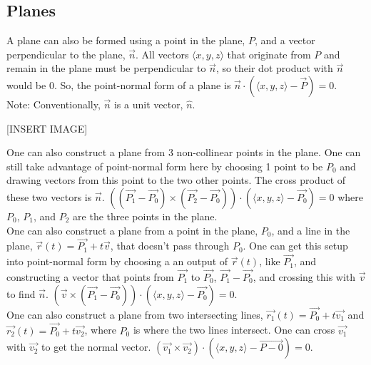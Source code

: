 \subsection{Planes}
\noindent
A plane can also be formed using a point in the plane, $P$, and a vector perpendicular to the plane, $\vec{n}$. All vectors $\langle x,y,z \rangle$ that originate from $P$ and remain in the plane must be perpendicular to $\vec{n}$, so their dot product with $\vec{n}$ would be 0. So, the point-normal form of a plane is $\vec{n}\cdot\left(\langle x,y,z \rangle - \vec{P}\right)=0$.\\
\small{Note: Conventionally, $\vec{n}$ is a unit vector, $\hat{n}$.}

[INSERT IMAGE]

\noindent
One can also construct a plane from 3 non-collinear points in the plane. One can still take advantage of point-normal form here by choosing 1 point to be $P_0$ and drawing vectors from this point to the two other points. The cross product of these two vectors is $\vec{n}$. $\left(\left(\vec{P_1}-\vec{P_0}\right)\times\left(\vec{P_2}-\vec{P_0}\right)\right)\cdot\left(\langle x,y,z \rangle - \vec{P_0}\right)=0$ where $P_0$, $P_1$, and $P_2$ are the three points in the plane.\\

\noindent
One can also construct a plane from a point in the plane, $P_0$, and a line in the plane, $\vec{r}(t)=\vec{P_1}+t\vec{v}$, that doesn't pass through $P_0$. One can get this setup into point-normal form by choosing a an output of $\vec{r}(t)$, like $\vec{P_1}$, and constructing a vector that points from $\vec{P_1}$ to $\vec{P_0}$, $\vec{P_1}-\vec{P_0}$, and crossing this with $\vec{v}$ to find $\vec{n}$. $\left(\vec{v}\times\left(\vec{P_1}-\vec{P_0}\right)\right)\cdot\left(\langle x,y,z \rangle - \vec{P_0}\right)=0$.\\

\noindent
One can also construct a plane from two intersecting lines, $\vec{r_1}(t)=\vec{P_0}+t\vec{v_1}$ and $\vec{r_2}(t)=\vec{P_0}+t\vec{v_2}$, where $P_0$ is where the two lines intersect. One can cross $\vec{v_1}$ with $\vec{v_2}$ to get the normal vector.
$\left(\vec{v_1}\times\vec{v_2}\right)\cdot\left(\langle x,y,z \rangle - \vec{P-0}\right)=0$.